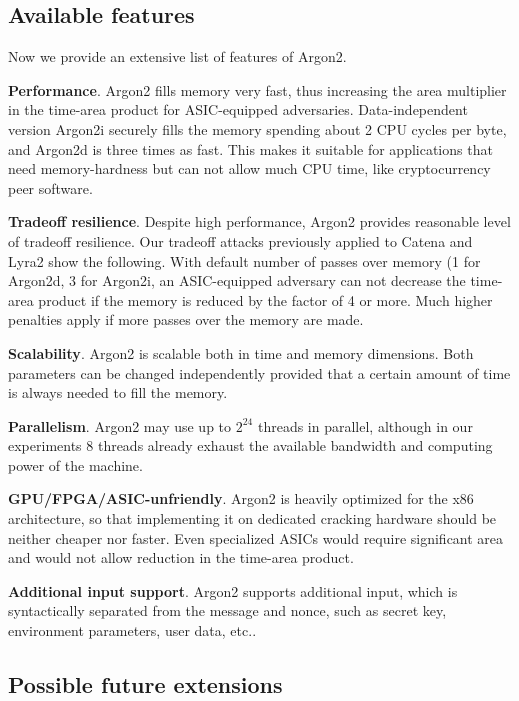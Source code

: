 \documentclass[a4paper]{article}
\begin{document}
\subsection{Available features}
Now we provide an extensive list of features of Argon2.

\textbf{Performance}. \textsf{Argon2} fills memory very fast, thus increasing the area multiplier in the time-area product for ASIC-equipped adversaries. Data-independent version \textsf{Argon2i} securely fills the memory spending about 2 CPU cycles per byte, and \textsf{Argon2d} is three times as fast. This makes it suitable for applications that need memory-hardness but can not allow much CPU time, like cryptocurrency peer software.

\textbf{Tradeoff resilience}.  Despite high performance, \textsf{Argon2} provides reasonable level of tradeoff resilience. Our tradeoff attacks previously applied to Catena and Lyra2 show the following. With default number of passes over memory (1 for \textsf{Argon2d}, 3 for \textsf{Argon2i}, an ASIC-equipped adversary can not decrease the time-area product if the memory is reduced by the factor of 4 or more. Much higher penalties apply if more passes over the memory are made. 

\textbf{Scalability}.  \textsf{Argon2} is scalable both in time and memory dimensions.  Both parameters can be changed independently provided that a certain amount of time is always needed to fill the memory. 

\textbf{Parallelism}. \textsf{Argon2}  may use up to $2^{24}$ threads in parallel,  although in our experiments 8 threads already exhaust the available bandwidth and computing power of the machine.

\textbf{GPU/FPGA/ASIC-unfriendly}. \textsf{Argon2} is heavily optimized for the x86 architecture, so that implementing it on  dedicated cracking hardware should  be neither cheaper nor faster. Even specialized ASICs would require significant area and would not allow reduction in the time-area product.

\textbf{Additional input support}. \textsf{Argon2} supports additional input, which is syntactically separated from the message and nonce, such as secret key, environment parameters, user data, etc..


\subsection{Possible future extensions}\label{sec:future2}
\end{document}
